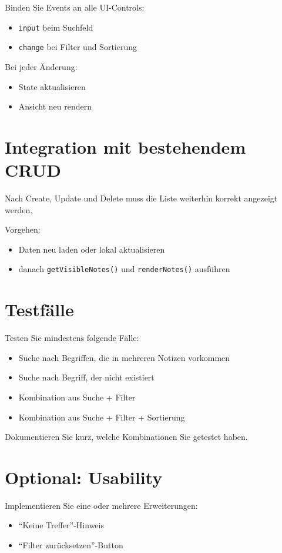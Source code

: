 \documentclass[a4paper,12pt]{article}
\begin{document}
Binden Sie Events an alle UI-Controls:
\begin{itemize}
    \item \texttt{input} beim Suchfeld
    \item \texttt{change} bei Filter und Sortierung
\end{itemize}

Bei jeder Änderung:
\begin{itemize}
    \item State aktualisieren
    \item Ansicht neu rendern
\end{itemize}

\section{Integration mit bestehendem CRUD}

Nach Create, Update und Delete muss die Liste weiterhin korrekt angezeigt werden.

Vorgehen:
\begin{itemize}
    \item Daten neu laden oder lokal aktualisieren
    \item danach \texttt{getVisibleNotes()} und \texttt{renderNotes()} ausführen
\end{itemize}

\section{Testfälle}

Testen Sie mindestens folgende Fälle:
\begin{itemize}
    \item Suche nach Begriffen, die in mehreren Notizen vorkommen
    \item Suche nach Begriff, der nicht existiert
    \item Kombination aus Suche + Filter
    \item Kombination aus Suche + Filter + Sortierung
\end{itemize}

Dokumentieren Sie kurz, welche Kombinationen Sie getestet haben.

\section{Optional: Usability}

Implementieren Sie eine oder mehrere Erweiterungen:
\begin{itemize}
    \item ``Keine Treffer''-Hinweis
    \item ``Filter zurücksetzen''-Button
\end{itemize}
\end{document}
